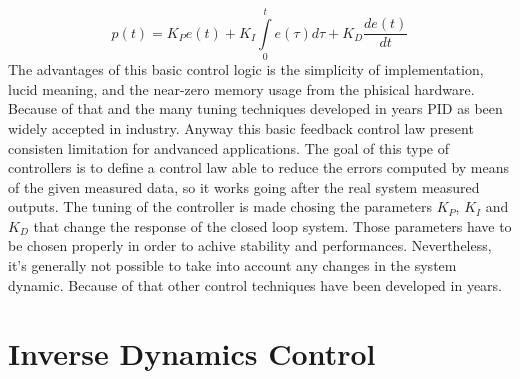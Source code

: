 \begin{equation}
	p( t) = K_P e(t) +K_I\int\limits_{0}^{t} e(\tau)d\tau + K_D \frac{de(t)}{dt}
\end{equation}
The advantages of this basic control logic is the simplicity of implementation, lucid meaning, and the near-zero memory usage from the phisical hardware. Because of that and the many tuning techniques developed in years PID as been widely accepted in industry. Anyway this basic feedback control law present consisten limitation for andvanced applications. The goal of this type of controllers is to define a control law able to reduce the errors computed by means of the given measured data, so it works going after the real system measured outputs. The tuning of the controller is made chosing the parameters $K_P$, $K_I$ and $K_D$ that change the response of the closed loop system. Those parameters have to be chosen properly in order to achive stability and performances. Nevertheless, it's generally not possible to take into account any changes in the system dynamic. Because of that other control techniques have been developed in years.


\section{Inverse Dynamics Control}

